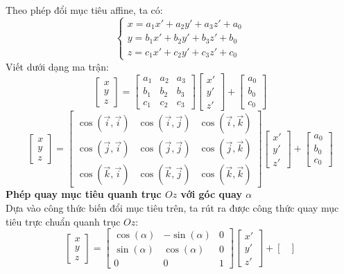\documentclass[12pt,a4]{article}
\begin{document}
\begin{titlepage}
Theo phép đổi mục tiêu affine, ta có:
\[
\begin{cases} x = a_1x' + a_2y' + a_3z' + a_0\\y = b_1x' + b_2y' + b_3z' + b_0\\z = c_1x' + c_2y' + c_3z' + c_0\end{cases}
\]
Viết dưới dạng ma trận:
\[
\begin{bmatrix} x\\y\\z\end{bmatrix} = \begin{bmatrix} a_1 &a_2&a_3\\b_1 &b_2&b_3\\c_1 &c_2&c_3\end{bmatrix} \begin{bmatrix}x'\\y'\\z'\end{bmatrix} + \begin{bmatrix}
a_0 \\b_0\\c_0
\end{bmatrix}
\]
\[
    \begin{bmatrix} x\\y\\z\end{bmatrix} = \begin{bmatrix} \cos(\vec{i},\vec{i}) &\cos(\vec{i},\vec{j})&\cos(\vec{i},\vec{k})\\ \cos(\vec{j},\vec{i}) &\cos(\vec{j},\vec{j})&\cos(\vec{j},\vec{k})\\ \cos(\vec{k},\vec{i}) &\cos(\vec{k},\vec{j})&\cos(\vec{k},\vec{k})\end{bmatrix} \begin{bmatrix}x'\\y'\\z'\end{bmatrix} + \begin{bmatrix}
        a_0 \\b_0\\c_0
        \end{bmatrix}
\]
\vspace{0.2cm}
\textbf{Phép quay mục tiêu quanh trục $Oz$ với góc quay $\alpha$}\\
Dựa vào công thức biến đổi mục tiêu trên, ta rút ra được công thức quay mục tiêu trực chuẩn quanh trục $Oz:$
\[
    \begin{bmatrix} x\\y\\z\end{bmatrix} = \begin{bmatrix} \cos(\alpha) &-\sin(\alpha)&0\\ \sin(\alpha) &\cos(\alpha)&0\\ 0 &0&1\end{bmatrix} \begin{bmatrix}x'\\y'\\z'\end{bmatrix} + \begin{bmatrix}

\end{bmatrix}\]
\end{titlepage}
\end{document}
